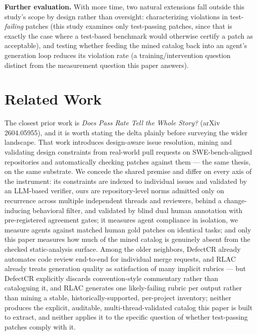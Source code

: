 \documentclass[11pt]{article}
\begin{document}
\vspace{0.5em}
\noindent\textbf{Further evaluation.} With more time, two natural extensions fall outside this study's scope by design rather than oversight: characterizing violations in test-\emph{failing} patches (this study examines only test-passing patches, since that is exactly the case where a test-based benchmark would otherwise certify a patch as acceptable), and testing whether feeding the mined catalog back into an agent's generation loop reduces its violation rate (a training/intervention question distinct from the measurement question this paper answers).

\section{Related Work}

The closest prior work is \textit{Does Pass Rate Tell the Whole Story?} (arXiv 2604.05955), and it is worth stating the delta plainly before surveying the wider landscape. That work introduces design-aware issue resolution, mining and validating design constraints from real-world pull requests on SWE-bench-aligned repositories and automatically checking patches against them --- the same thesis, on the same substrate. We concede the shared premise and differ on every axis of the instrument: its constraints are indexed to individual issues and validated by an LLM-based verifier, ours are repository-level norms admitted only on recurrence across multiple independent threads and reviewers, behind a change-inducing behavioral filter, and validated by blind dual human annotation with pre-registered agreement gates; it measures agent compliance in isolation, we measure agents against matched human gold patches on identical tasks; and only this paper measures how much of the mined catalog is genuinely absent from the checked static-analysis surface. Among the older neighbors, DefectCR already automates code review end-to-end for individual merge requests, and RLAC already treats generation quality as satisfaction of many implicit rubrics --- but DefectCR explicitly discards convention-style commentary rather than cataloguing it, and RLAC generates one likely-failing rubric per output rather than mining a stable, historically-supported, per-project inventory; neither produces the explicit, auditable, multi-thread-validated catalog this paper is built to extract, and neither applies it to the specific question of whether test-passing patches comply with it.
\end{document}
